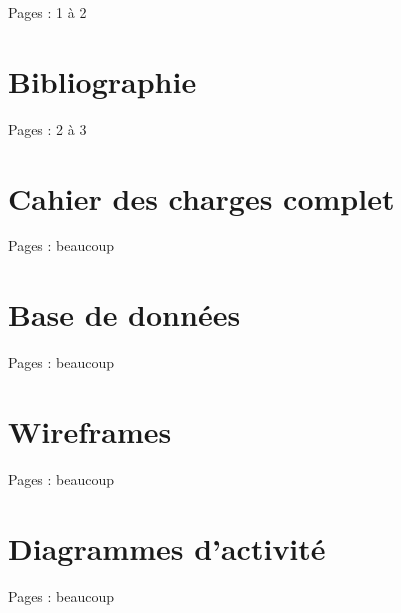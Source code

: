 \documentclass{eplmastersthesis_FR}
\begin{document}
		Pages : 1 à 2

	\chapter*{Bibliographie}

		Pages : 2 à 3

	\appendix

	\chapter{Cahier des charges complet}

		Pages : beaucoup

	\chapter{Base de données}

		Pages : beaucoup

	\chapter{Wireframes}

		Pages : beaucoup

	\chapter{Diagrammes d'activité}

		Pages : beaucoup

	\setlength{\parskip}{0em}
	\backcoverpage
\end{document}
